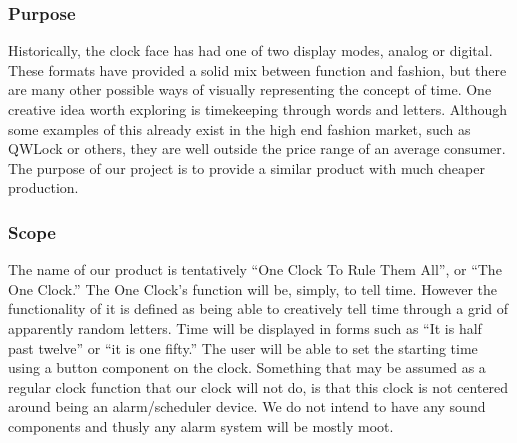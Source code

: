 \documentclass[onecolumn, draftclsnofoot,10pt, compsoc]{IEEEtran}
\begin{document}
\subsubsection{Purpose}
Historically, the clock face has had one of two display modes, analog or digital.
These formats have provided a solid mix between function and fashion, but there are many
other possible ways of visually representing the concept of time. One creative idea worth
exploring is timekeeping through words and letters. Although some examples of this already
exist in the high end fashion market, such as QWLock or others, they are well outside the
price range of an average consumer. The purpose of our project is to provide a similar
product with much cheaper production.

\subsubsection{Scope}
The name of our product is tentatively “One Clock To Rule Them All”, or “The One Clock.”
The One Clock’s function will be, simply, to tell time. However the functionality of it is
defined as being able to creatively tell time through a grid of apparently random letters.
Time will be displayed in forms such as “It is half past twelve” or “it is one fifty.” The
user will be able to set the starting time using a button component on the clock. Something
that may be assumed as a regular clock function that our clock will not do, is that this clock
 is not centered around being an alarm/scheduler device. We do not intend to have any sound
 components and thusly any alarm system will be mostly moot.
\end{document}
